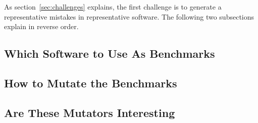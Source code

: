 
As section~\ref{sec:challenges} explains, the first challenge is to
generate a representative mistakes in representative software. The
following two subsections explain in reverse order. 

\def\sub#1#2{\subsection{#2} \label{sub:mutate-#1} }

\sub{benchmarks} {Which Software to Use As Benchmarks}
\sub{mutators}   {How to Mutate the Benchmarks} 
\sub{interesting}{Are These Mutators Interesting} 
